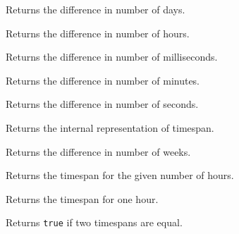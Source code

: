 Returns the difference in number of days.


\label{wxtimespangethours}


Returns the difference in number of hours.


\label{wxtimespangetmilliseconds}


Returns the difference in number of milliseconds.


\label{wxtimespangetminutes}


Returns the difference in number of minutes.


\label{wxtimespangetseconds}


Returns the difference in number of seconds.


\label{wxtimespangetvalue}


Returns the internal representation of timespan.


\label{wxtimespangetweeks}


Returns the difference in number of weeks.


\label{wxtimespanhours}


Returns the timespan for the given number of hours.


\label{wxtimespanhour}


Returns the timespan for one hour.


\label{wxtimespanisequalto}


Returns {\tt true} if two timespans are equal.


\label{wxtimespanislongerthan}

